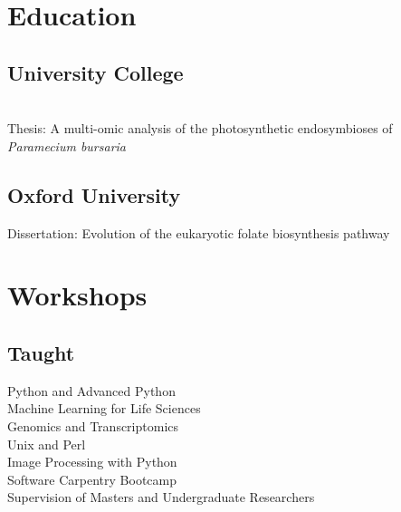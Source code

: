 \documentclass[]{Finlay_Maguire_CV}
\begin{document}
%
%
\lastupdated

%
%

%
%

\begin{minipage}[t]{0.33\textwidth} 


\section{Education} 

\subsection{University College }
\\
Thesis: A multi-omic analysis of the photosynthetic endosymbioses of \textit{Paramecium bursaria} \\
\sectionsep

\subsection{Oxford University}
Dissertation: Evolution of the eukaryotic folate biosynthesis pathway\\
\sectionsep



\section{Workshops}
\subsection{Taught}
Python and Advanced Python\\
Machine Learning for Life Sciences\\
Genomics and Transcriptomics\\
Unix and Perl\\
Image Processing with Python\\
Software Carpentry Bootcamp\\
Supervision of Masters and Undergraduate Researchers\\
\sectionsep


\end{minipage}
\end{document}
